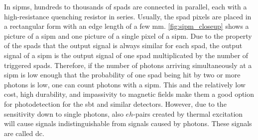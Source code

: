 In \acp{sipm}, hundreds to thousands of \acp{spad} are connected in parallel, each with a high-resistance quenching resistor in series. 
Usually, the \ac{spad} pixels are placed in a rectangular form with an edge length of a few \si{\milli\meter}.
\autoref{fig:sipm_closeup} shows a picture of a \ac{sipm} and one picture of a single pixel of a \ac{sipm}.
Due to the property of the \acp{spad} that the output signal is always similar for each \ac{spad}, the output signal of a \ac{sipm} is the output signal of one \ac{spad} multiplicated by the number of triggered \acp{spad}.
Therefore, if the number of photons arriving simultaneously at a \ac{sipm} is low enough that the probability of one \ac{spad} being hit by two or more photons is low, one can count photons with a \ac{sipm}.
This and the relatively low cost, high durability, and impassivity to magnetic fields make them a good option for photodetection for the \ac{sbt} and similar detectors.
However, due to the sensitivity down to single photons, also $eh$-pairs created by thermal excitation will cause signals indistinguishable from signals caused by photons.
These signals are called \ac{dc}.






